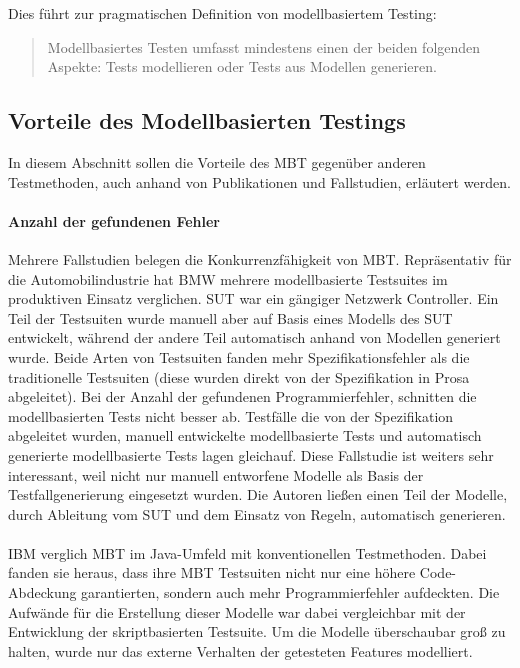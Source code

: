 Dies führt zur pragmatischen Definition von modellbasiertem Testing:

\begin{quote}
Modellbasiertes Testen umfasst mindestens einen der beiden folgenden Aspekte: Tests modellieren oder Tests aus Modellen generieren.
\end{quote}

\subsection{Vorteile des Modellbasierten Testings}
In diesem Abschnitt sollen die Vorteile des MBT gegenüber anderen Testmethoden, auch anhand von Publikationen und Fallstudien, erläutert werden.

\paragraph{Anzahl der gefundenen Fehler} Mehrere Fallstudien belegen die Konkurrenzfähigkeit von MBT. Repräsentativ für die Automobilindustrie hat BMW mehrere modellbasierte Testsuites im produktiven Einsatz verglichen.\cite{pretschner_one_2005} SUT war ein gängiger Netzwerk Controller. Ein Teil der Testsuiten wurde manuell aber auf Basis eines Modells des SUT entwickelt, während der andere Teil automatisch anhand von Modellen generiert wurde. Beide Arten von Testsuiten fanden mehr Spezifikationsfehler als die traditionelle Testsuiten (diese wurden direkt von der Spezifikation in Prosa abgeleitet). Bei der Anzahl der gefundenen Programmierfehler, schnitten die modellbasierten Tests nicht besser ab. Testfälle die von der Spezifikation abgeleitet wurden, manuell entwickelte modellbasierte Tests und automatisch generierte modellbasierte Tests lagen gleichauf. Diese Fallstudie ist weiters sehr interessant, weil nicht nur manuell entworfene Modelle als Basis der Testfallgenerierung eingesetzt wurden. Die Autoren ließen einen Teil der Modelle, durch Ableitung vom SUT und dem Einsatz von Regeln, automatisch generieren.\\  \\
IBM verglich MBT im Java-Umfeld mit konventionellen Testmethoden.\cite{farchi_using_2002} Dabei fanden sie heraus, dass ihre MBT Testsuiten nicht nur eine höhere Code-Abdeckung garantierten, sondern auch mehr Programmierfehler aufdeckten. Die Aufwände für die Erstellung dieser Modelle war dabei vergleichbar mit der Entwicklung der skriptbasierten Testsuite. Um die Modelle überschaubar groß zu halten, wurde nur das externe Verhalten der getesteten Features modelliert.\\
